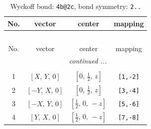 \documentclass[fleqn,8pt]{jsarticle}
\begin{document}
\renewcommand{\arraystretch}{1.2}
\begin{longtable}{cccc}
\caption{Wyckoff bond: {\tt 4b@2c}, bond symmetry: {\tt 2..}}
 \\
 \hline \hline
No. & vector & center & mapping \\ \hline \endfirsthead

\multicolumn{3}{l}{\tablename\ \thetable{}} \\
 \hline \hline
No. & vector & center & mapping \\ \hline \endhead

 \hline \hline
\multicolumn{3}{r}{\footnotesize\it continued ...} \\ \endfoot

 \hline \hline
\multicolumn{3}{r}{} \\ \endlastfoot

1 & $\left[ X,\, Y,\, 0 \right]$ & $\left[ 0,\, \frac{1}{2},\, z \right]$ & {\tt [1,-2]} \\ \hline
2 & $\left[ - Y,\, X,\, 0 \right]$ & $\left[ 0,\, \frac{1}{2},\, z \right]$ & {\tt [3,-4]} \\ \hline
3 & $\left[ - X,\, Y,\, 0 \right]$ & $\left[ \frac{1}{2},\, 0,\, - z \right]$ & {\tt [5,-6]} \\ \hline
4 & $\left[ Y,\, X,\, 0 \right]$ & $\left[ \frac{1}{2},\, 0,\, - z \right]$ & {\tt [7,-8]} \\
\end{longtable}
\renewcommand{\arraystretch}{1.2}
\end{document}
